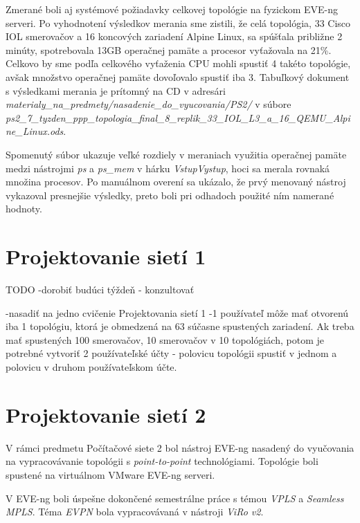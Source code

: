 Zmerané boli aj systémové požiadavky celkovej topológie na fyzickom EVE-ng serveri. Po vyhodnotení výsledkov merania sme zistili, že celá topológia, 33 Cisco IOL smerovačov a 16 koncových zariadení Alpine Linux, sa spúšťala približne 2 minúty, spotrebovala 13GB operačnej pamäte a procesor vyťažovala na 21\%. Celkovo by sme podľa celkového vyťaženia CPU mohli spustiť 4 takéto topológie, avšak množstvo operačnej pamäte dovoľovalo spustiť iba 3. Tabuľkový dokument s výsledkami merania je prítomný na CD v adresári \\ \emph{materialy\_na\_predmety/nasadenie\_do\_vyucovania/PS2/} v súbore \\ \emph{ps2\_7\_tyzden\_ppp\_topologia\_final\_8\_replik\_33\_IOL\_L3\_a\_16\_QEMU\_Alpine\_Linux.ods}.

Spomenutý súbor ukazuje veľké rozdiely v meraniach využitia operačnej pamäte medzi nástrojmi \emph{ps} a \emph{ps\_mem} v hárku \emph{VstupVystup}, hoci sa merala rovnaká množina procesov. Po manuálnom overení sa ukázalo, že prvý menovaný nástroj vykazoval presnejšie výsledky, preto boli pri odhadoch použité ním namerané hodnoty.





\section{Projektovanie sietí 1}

{\huge TODO -dorobiť budúci týždeň - konzultovať}

-nasadiť na jedno cvičenie Projektovania sietí 1
-1 používateľ môže mať otvorenú iba 1 topológiu, ktorá je obmedzená na 63 súčasne spustených zariadení. Ak treba mať spustených 100 smerovačov, 10 smerovačov v 10 topológiách, potom je potrebné vytvoriť 2 používateľské účty - polovicu topológii spustiť v jednom a polovicu v druhom používateľskom účte.





\section{Projektovanie sietí 2}

V rámci predmetu Počítačové siete 2 bol nástroj EVE-ng nasadený do vyučovania na vypracovávanie topológii s \emph{point-to-point} technológiami. Topológie boli spustené na virtuálnom VMware EVE-ng serveri.

V EVE-ng boli úspešne dokončené semestrálne práce s témou \emph{VPLS} a \emph{Seamless MPLS}. Téma \emph{EVPN} bola vypracovávaná v nástroji \emph{ViRo v2}.

